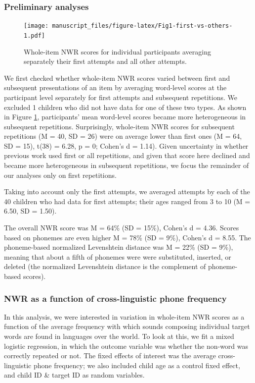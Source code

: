 \documentclass[english,,man,floatsintext]{apa6}
\begin{document}
\subsubsection{Preliminary analyses}\label{preliminary-analyses}

\begin{figure}
\centering
\texttt{[image: manuscript\_files/figure-latex/Fig1-first-vs-others-1.pdf]}
\caption{\label{fig:Fig1-first-vs-others}Whole-item NWR scores for
individual participants averaging separately their first attempts and
all other attempts.}
\end{figure}

We first checked whether whole-item NWR scores varied between first and
subsequent presentations of an item by averaging word-level scores at
the participant level separately for first attempts and subsequent
repetitions. We excluded 1 children who did not have data for one of
these two types. As shown in Figure \ref{fig:Fig1-first-vs-others},
participants' mean word-level scores became more heterogeneous in
subsequent repetitions. Surprisingly, whole-item NWR scores for
subsequent repetitions (M = 40, SD = 26) were on average lower than
first ones (M = 64, SD = 15), t(38) = 6.28, p = 0; Cohen's d = 1.14).
Given uncertainty in whether previous work used first or all
repetitions, and given that score here declined and became more
heterogeneous in subsequent repetitions, we focus the remainder of our
analyses only on first repetitions.

Taking into account only the first attempts, we averaged attempts by
each of the 40 children who had data for first attempts; their ages
ranged from 3 to 10 (M = 6.50, SD = 1.50).

The overall NWR score was M = 64\% (SD = 15\%), Cohen's d = 4.36. Scores
based on phonemes are even higher M = 78\% (SD = 9\%), Cohen's d = 8.55.
The phoneme-based normalized Levenshtein distance was M = 22\% (SD =
9\%), meaning that about a fifth of phonemes were were substituted,
inserted, or deleted (the normalized Levenshtein distance is the
complement of phoneme-based scores).

\subsubsection{NWR as a function of cross-linguistic phone
frequency}\label{nwr-as-a-function-of-cross-linguistic-phone-frequency}

In this analysis, we were interested in variation in whole-item NWR
scores as a function of the average frequency with which sounds
composing individual target words are found in languages over the world.
To look at this, we fit a mixed logistic regression, in which the
outcome variable was whether the non-word was correctly repeated or not.
The fixed effects of interest was the average cross-linguistic phone
frequency; we also included child age as a control fixed effect, and
child ID \& target ID as random variables.
\end{document}
